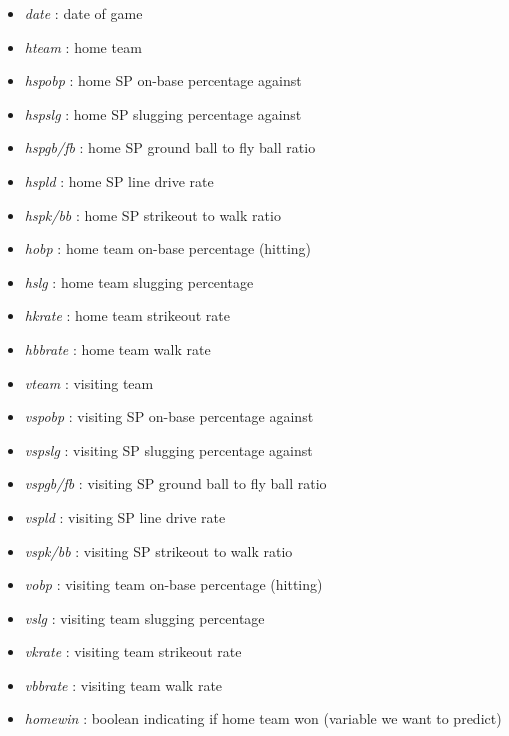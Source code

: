 \documentclass[12pt,onecolumn]{article}
\begin{document}
\begin{itemize}
  \item \textit{date} : date of game
  \item \textit{h\textunderscore team} : home team
  \item \textit{h\textunderscore sp\textunderscore obp} : home SP on-base percentage against
  \item \textit{h\textunderscore sp\textunderscore slg} : home SP slugging percentage against
  \item \textit{h\textunderscore sp\textunderscore gb/fb} : home SP ground ball to fly ball ratio
  \item \textit{h\textunderscore sp\textunderscore ld} : home SP line drive rate
  \item \textit{h\textunderscore sp\textunderscore k/bb} : home SP strikeout to walk ratio
  \item \textit{h\textunderscore obp} : home team on-base percentage (hitting)
  \item \textit{h\textunderscore slg} : home team slugging percentage
  \item \textit{h\textunderscore k\textunderscore rate} : home team strikeout rate
  \item \textit{h\textunderscore bb\textunderscore rate} : home team walk rate
  \item \textit{v\textunderscore team} : visiting team
  \item \textit{v\textunderscore sp\textunderscore obp} : visiting SP on-base percentage against
  \item \textit{v\textunderscore sp\textunderscore slg} : visiting SP slugging percentage against
  \item \textit{v\textunderscore sp\textunderscore gb/fb} : visiting SP ground ball to fly ball ratio
  \item \textit{v\textunderscore sp\textunderscore ld} : visiting SP line drive rate
  \item \textit{v\textunderscore sp\textunderscore k/bb} : visiting SP strikeout to walk ratio
  \item \textit{v\textunderscore obp} : visiting team on-base percentage (hitting)
  \item \textit{v\textunderscore slg} : visiting team slugging percentage
  \item \textit{v\textunderscore k\textunderscore rate} : visiting team strikeout rate
  \item \textit{v\textunderscore bb\textunderscore rate} : visiting team walk rate
  \item \textit{home\textunderscore win} : boolean indicating if home team won (variable we want to predict)
\end{itemize}
\end{document}
